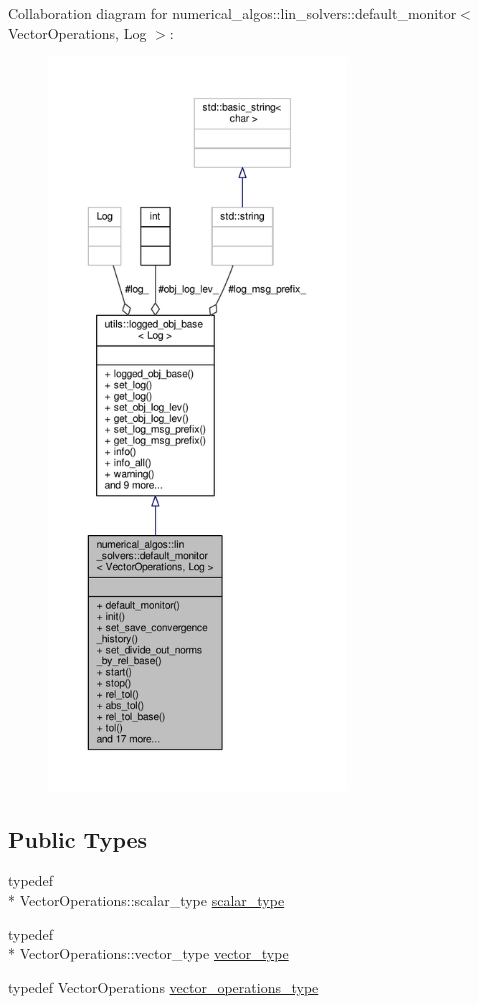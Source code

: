 Collaboration diagram for numerical\-\_\-algos\-:\-:lin\-\_\-solvers\-:\-:default\-\_\-monitor$<$ Vector\-Operations, Log $>$\-:
\nopagebreak
\begin{figure}[H]
\begin{center}
\leavevmode
\includegraphics[height=550pt]{classnumerical__algos_1_1lin__solvers_1_1default__monitor__coll__graph}
\end{center}
\end{figure}
\subsection*{Public Types}
\begin{DoxyCompactItemize}
\item 
typedef \\*
Vector\-Operations\-::scalar\-\_\-type \hyperlink{classnumerical__algos_1_1lin__solvers_1_1default__monitor_a9c025ecb40da565f0f1584cbf2b10999}{scalar\-\_\-type}
\item 
typedef \\*
Vector\-Operations\-::vector\-\_\-type \hyperlink{classnumerical__algos_1_1lin__solvers_1_1default__monitor_afe4ad299b536cf5df8efbd2c08b619f5}{vector\-\_\-type}
\item 
typedef Vector\-Operations \hyperlink{classnumerical__algos_1_1lin__solvers_1_1default__monitor_a1353cb66ac3391ffaba236b3a860dc8e}{vector\-\_\-operations\-\_\-type}
\end{DoxyCompactItemize}
